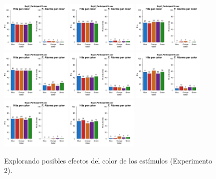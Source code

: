 \begin{figure}[th]
\includegraphics[width=0.30\textwidth]{Figures/Color_Exp2_P13} \includegraphics[width=0.30\textwidth]{Figures/Color_Exp2_P14} \includegraphics[width=0.30\textwidth]{Figures/Color_Exp2_P15}
\includegraphics[width=0.30\textwidth]{Figures/Color_Exp2_P16} \includegraphics[width=0.30\textwidth]{Figures/Color_Exp2_P17} \includegraphics[width=0.30\textwidth]{Figures/Color_Exp2_P18}
\includegraphics[width=0.30\textwidth]{Figures/Color_Exp2_P19} \includegraphics[width=0.30\textwidth]{Figures/Color_Exp2_P20} 
\caption[Color_Exp2]{Explorando posibles efectos del color de los estímulos (Experimento 2).}
\label{fig:Color_E2}
\end{figure}

